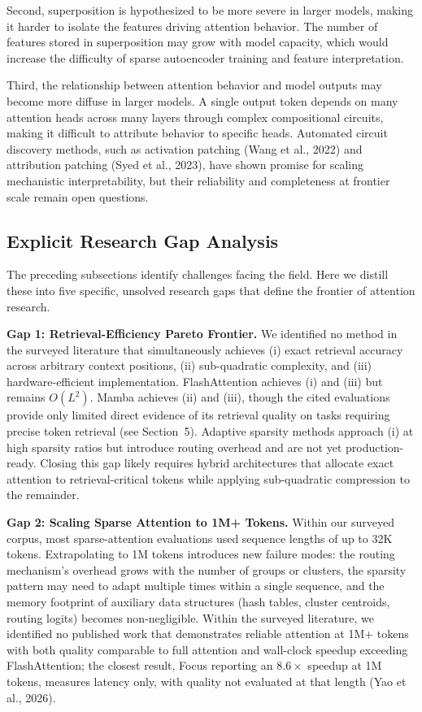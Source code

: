 \documentclass[10pt,twocolumn]{article}
\begin{document}
Second, superposition is hypothesized to be more severe in larger models, making it harder to isolate the features driving attention behavior. The number of features stored in superposition may grow with model capacity, which would increase the difficulty of sparse autoencoder training and feature interpretation.

Third, the relationship between attention behavior and model outputs may become more diffuse in larger models. A single output token depends on many attention heads across many layers through complex compositional circuits, making it difficult to attribute behavior to specific heads. Automated circuit discovery methods, such as activation patching (Wang et al., 2022) and attribution patching (Syed et al., 2023), have shown promise for scaling mechanistic interpretability, but their reliability and completeness at frontier scale remain open questions.

\subsection{Explicit Research Gap Analysis}\label{explicit-research-gap-analysis}

The preceding subsections identify challenges facing the field. Here we distill these into five specific, unsolved research gaps that define the frontier of attention research.

\textbf{Gap 1: Retrieval-Efficiency Pareto Frontier.} We identified no method in the surveyed literature that simultaneously achieves (i) exact retrieval accuracy across arbitrary context positions, (ii) sub-quadratic complexity, and (iii) hardware-efficient implementation. FlashAttention achieves (i) and (iii) but remains $O(L^2)$. Mamba achieves (ii) and (iii), though the cited evaluations provide only limited direct evidence of its retrieval quality on tasks requiring precise token retrieval (see Section~5). Adaptive sparsity methods approach (i) at high sparsity ratios but introduce routing overhead and are not yet production-ready. Closing this gap likely requires hybrid architectures that allocate exact attention to retrieval-critical tokens while applying sub-quadratic compression to the remainder.

\textbf{Gap 2: Scaling Sparse Attention to 1M+ Tokens.} Within our surveyed corpus, most sparse-attention evaluations used sequence lengths of up to 32K tokens. Extrapolating to 1M tokens introduces new failure modes: the routing mechanism's overhead grows with the number of groups or clusters, the sparsity pattern may need to adapt multiple times within a single sequence, and the memory footprint of auxiliary data structures (hash tables, cluster centroids, routing logits) becomes non-negligible. Within the surveyed literature, we identified no published work that demonstrates reliable attention at 1M+ tokens with both quality comparable to full attention and wall-clock speedup exceeding FlashAttention; the closest result, Focus reporting an $8.6\times$ speedup at 1M tokens, measures latency only, with quality not evaluated at that length (Yao et al., 2026).
\end{document}
